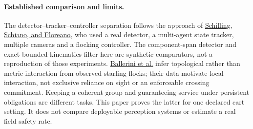 \documentclass[11pt]{article}
\begin{document}
\paragraph{Established comparison and limits.}
The detector--tracker--controller separation follows the approach of \href{https://arxiv.org/abs/2012.01245v2}{Schilling, Schiano, and Floreano}, who used a real detector, a multi-agent state tracker, multiple cameras and a flocking controller. The component-span detector and exact bounded-kinematics filter here are synthetic comparators, not a reproduction of those experiments. \href{https://doi.org/10.1073/pnas.0711437105}{Ballerini et al.} infer topological rather than metric interaction from observed starling flocks; their data motivate local interaction, not exclusive reliance on sight or an enforceable crossing commitment. Keeping a coherent group and guaranteeing service under persistent obligations are different tasks. This paper proves the latter for one declared cart setting. It does not compare deployable perception systems or estimate a real field safety rate.
\end{document}
